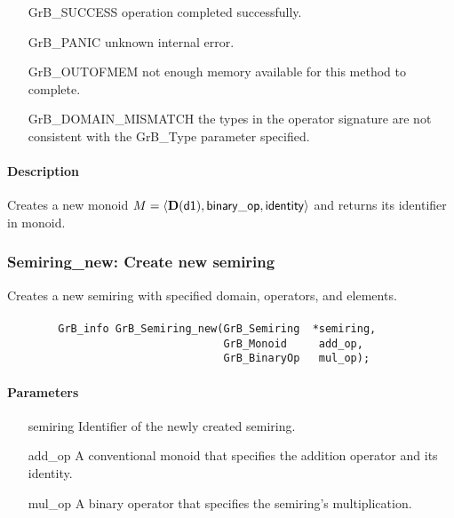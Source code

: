 \begin{itemize}[leftmargin=2.1in]
\item[{\sf GrB\_SUCCESS}]           operation completed successfully.
\item[{\sf GrB\_PANIC}]             unknown internal error.
\item[{\sf GrB\_OUTOFMEM}]          not enough memory available for this method to complete.
\item[{\sf GrB\_DOMAIN\_MISMATCH}]  the types in the operator signature are not   
                                    consistent with the {\sf GrB\_Type} parameter specified.
\end{itemize}

\paragraph{Description}

Creates a new monoid $M = \langle \bold{D}({\sf d1}), 
{\sf binary\_op}, {\sf identity} \rangle$ and
returns its identifier in {\sf monoid}.


\subsubsection{{\sf Semiring\_new}: Create new semiring}

Creates a new semiring with specified domain, operators, and elements.

\paragraph{\syntax}

\begin{verbatim}
        GrB_info GrB_Semiring_new(GrB_Semiring  *semiring,
                                  GrB_Monoid     add_op,
                                  GrB_BinaryOp   mul_op);
\end{verbatim}

\paragraph{Parameters}

\begin{itemize}[leftmargin=1.1in]
    \item[{\sf semiring}]       Identifier of the newly created semiring.
    \item[{\sf add\_op}]        A conventional monoid that specifies the addition operator and its identity.
    \item[{\sf mul\_op}]        A binary operator that specifies the semiring's multiplication.
\end{itemize}


